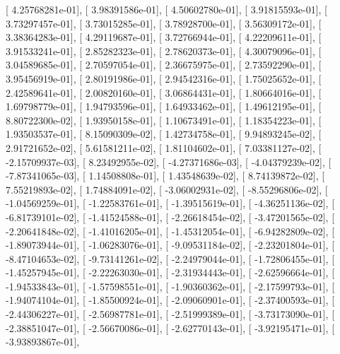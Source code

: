 \documentclass{article}
\begin{document}
       [  4.25768281e-01],
       [  3.98391586e-01],
       [  4.50602780e-01],
       [  3.91815593e-01],
       [  3.73297457e-01],
       [  3.73015285e-01],
       [  3.78928700e-01],
       [  3.56309172e-01],
       [  3.38364283e-01],
       [  4.29119687e-01],
       [  3.72766944e-01],
       [  4.22209611e-01],
       [  3.91533241e-01],
       [  2.85282323e-01],
       [  2.78620373e-01],
       [  4.30079096e-01],
       [  3.04589685e-01],
       [  2.70597054e-01],
       [  2.36675975e-01],
       [  2.73592290e-01],
       [  3.95456919e-01],
       [  2.80191986e-01],
       [  2.94542316e-01],
       [  1.75025652e-01],
       [  2.42589641e-01],
       [  2.00820160e-01],
       [  3.06864431e-01],
       [  1.80664016e-01],
       [  1.69798779e-01],
       [  1.94793596e-01],
       [  1.64933462e-01],
       [  1.49612195e-01],
       [  8.80722300e-02],
       [  1.93950158e-01],
       [  1.10673491e-01],
       [  1.18354223e-01],
       [  1.93503537e-01],
       [  8.15090309e-02],
       [  1.42734758e-01],
       [  9.94893245e-02],
       [  2.91721652e-02],
       [  5.61581211e-02],
       [  1.81104602e-01],
       [  7.03381127e-02],
       [ -2.15709937e-03],
       [  8.23492955e-02],
       [ -4.27371686e-03],
       [ -4.04379239e-02],
       [ -7.87341065e-03],
       [  1.14508808e-01],
       [  1.43548639e-02],
       [  8.74139872e-02],
       [  7.55219893e-02],
       [  1.74884091e-02],
       [ -3.06002931e-02],
       [ -8.55296806e-02],
       [ -1.04569259e-01],
       [ -1.22583761e-01],
       [ -1.39515619e-01],
       [ -4.36251136e-02],
       [ -6.81739101e-02],
       [ -1.41524588e-01],
       [ -2.26618454e-02],
       [ -3.47201565e-02],
       [ -2.20641848e-02],
       [ -1.41016205e-01],
       [ -1.45312054e-01],
       [ -6.94282809e-02],
       [ -1.89073944e-01],
       [ -1.06283076e-01],
       [ -9.09531184e-02],
       [ -2.23201804e-01],
       [ -8.47104653e-02],
       [ -9.73141261e-02],
       [ -2.24979044e-01],
       [ -1.72806455e-01],
       [ -1.45257945e-01],
       [ -2.22263030e-01],
       [ -2.31934443e-01],
       [ -2.62596664e-01],
       [ -1.94533843e-01],
       [ -1.57598551e-01],
       [ -1.90360362e-01],
       [ -2.17599793e-01],
       [ -1.94074104e-01],
       [ -1.85500924e-01],
       [ -2.09060901e-01],
       [ -2.37400593e-01],
       [ -2.44306227e-01],
       [ -2.56987781e-01],
       [ -2.51999389e-01],
       [ -3.73173090e-01],
       [ -2.38851047e-01],
       [ -2.56670086e-01],
       [ -2.62770143e-01],
       [ -3.92195471e-01],
       [ -3.93893867e-01],
\end{document}
